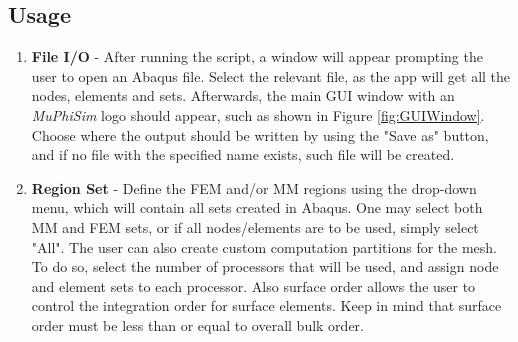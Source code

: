 \documentclass[oneside,11pt,times]{book}
\begin{document}
\subsection{Usage}
\begin{enumerate}
\item\textbf{File I/O} - After running the script, a window will appear prompting the user to open an Abaqus file. Select the relevant file, as the app will get all the nodes, elements and sets. Afterwards, the main GUI window with an \textit{MuPhiSim} logo should appear, such as shown in Figure \ref{fig:GUIWindow}. Choose where the output should be written by using the "Save as" button, and if no file with the specified name exists, such file will be created.

\item\textbf{Region Set} - Define the FEM and/or MM regions using the drop-down menu, which will contain all sets created in Abaqus. One may select both MM and FEM sets, or if all nodes/elements are to be used, simply select "All". The user can also create custom computation partitions for the mesh. To do so, select the number of processors that will be used, and assign node and element sets to each processor. Also surface order allows the user to control the integration order for surface elements. Keep in mind that surface order must be less than or equal to overall bulk order.


\end{enumerate}
\end{document}
